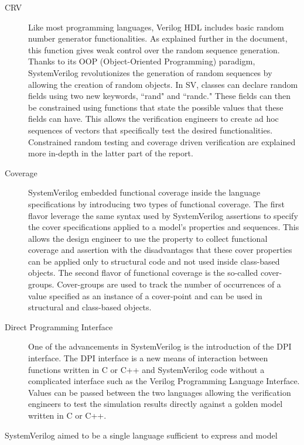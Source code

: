 \begin{description}
    \item[CRV] Like most programming languages, Verilog HDL includes basic
      random number generator functionalities. As explained further in the
      document, this function gives weak control over the random sequence
      generation. Thanks to its OOP (Object-Oriented Programming) paradigm,
      SystemVerilog revolutionizes the generation of random sequences by
      allowing the creation of random objects. In SV, classes can declare random
      fields using two new keywords, ``rand" and ``randc." These fields can then
      be constrained using functions that state the possible values that these
      fields can have. This allows the verification engineers to create ad hoc
      sequences of vectors that specifically test the desired functionalities.
      Constrained random testing and coverage driven verification are explained
      more in-depth in the latter part of the report.
    
    \item[Coverage] SystemVerilog embedded functional coverage inside the
      language specifications by introducing two types of functional coverage.
      The first flavor leverage the same syntax used by SystemVerilog assertions
      to specify the cover specifications applied to a model's properties and
      sequences. This allows the design engineer to use the property to collect
      functional coverage and assertion with the disadvantages that these cover
      properties can be applied only to structural code and not used inside
      class-based objects. The second flavor of functional coverage is the
      so-called cover-groups. Cover-groups are used to track the number of
      occurrences of a value specified as an instance of a cover-point and can
      be used in structural and class-based objects.
    
    \item[Direct Programming Interface] One of the advancements in SystemVerilog
      is the introduction of the DPI interface. The DPI interface is a new means
      of interaction between functions written in C or C++ and SystemVerilog
      code without a complicated interface such as the Verilog Programming
      Language Interface. Values can be passed between the two languages
      allowing the verification engineers to test the simulation results
      directly against a golden model written in C or C++.

\end{description}
SystemVerilog aimed to be a single language sufficient to express and model
